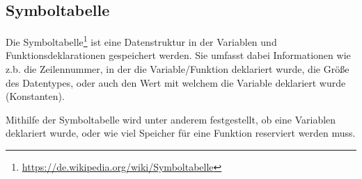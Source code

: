 \subsection{Symboltabelle}

Die Symboltabelle\footnote{\url{https://de.wikipedia.org/wiki/Symboltabelle}} ist eine Datenstruktur in der Variablen und Funktionsdeklarationen gespeichert werden. Sie umfasst dabei Informationen wie z.b. die Zeilennummer, in der die Variable/Funktion deklariert wurde, die Gr\"o\ss{}e des Datentypes, oder auch den Wert mit welchem die Variable deklariert wurde (Konstanten).

Mithilfe der Symboltabelle wird unter anderem festgestellt, ob eine Variablen deklariert wurde, oder wie viel Speicher f\"ur eine Funktion reserviert werden muss.


